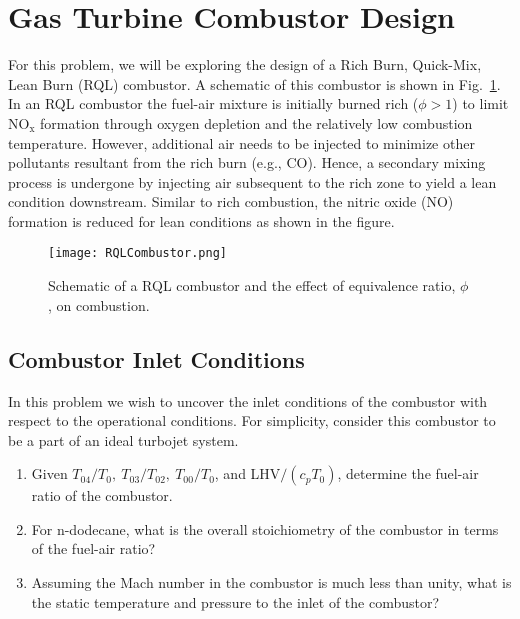 \documentclass[11pt]{article}
\begin{document}
\section{Gas Turbine Combustor Design}
For this problem, we will be exploring the design of a Rich Burn, Quick-Mix, Lean Burn (RQL) combustor. A schematic of this combustor is shown in Fig.~\ref{FIG_RQL}. In an RQL combustor the fuel-air mixture is initially burned rich ($\phi>1$) to limit NO$_\mathrm{x}$ formation through oxygen depletion and the relatively low combustion temperature. However, additional air needs to be injected to minimize other pollutants resultant from the rich burn (e.g., CO). Hence, a secondary mixing process is undergone by injecting air subsequent to the rich zone to yield a lean condition downstream. Similar to rich combustion, the nitric oxide (NO) formation is reduced for lean conditions as shown in the figure.

\begin{figure}[!ht!]
	\begin{center}
		\texttt{[image: RQLCombustor.png]}
		\caption{\label{FIG_RQL} Schematic of a RQL combustor and the effect of equivalence ratio, $\phi$, on combustion.}
	\end{center}
\end{figure}
\subsection{Combustor Inlet Conditions}
In this problem we wish to uncover the inlet conditions of the combustor with respect to the operational conditions. For simplicity, consider this combustor to be a part of an ideal turbojet system.
\begin{enumerate}
	\item
    	Given $T_{04}/T_0,\ T_{03}/T_{02},\ T_{00}/T_{0}$, and LHV$/(c_pT_0)$, determine the fuel-air ratio of the combustor.
    \item
    	For n-dodecane, what is the overall stoichiometry of the combustor in terms of the fuel-air ratio? 
    \item
    	Assuming the Mach number in the combustor is much less than unity, what is the static temperature and pressure to the inlet of the combustor?
\end{enumerate}
\end{document}
